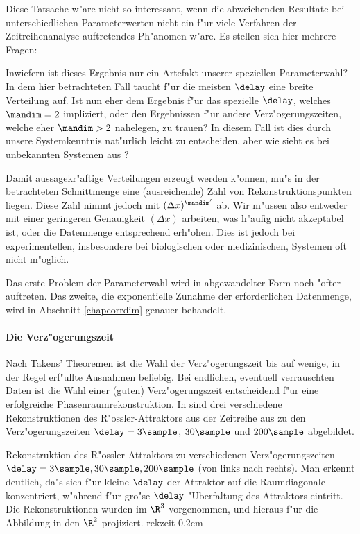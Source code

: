 Diese Tatsache w"are nicht so interessant, wenn die abweichenden Resultate bei
unterschiedlichen Parameterwerten nicht ein f"ur viele Verfahren der Zeitreihenanalyse
auftretendes Ph"anomen w"are. Es stellen sich hier mehrere Fragen:
\begin{myitemize}
\item Inwiefern ist dieses Ergebnis nur ein Artefakt unserer speziellen Parameterwahl? In
  dem hier betrachteten Fall taucht f"ur die meisten $\delay$ eine breite Verteilung auf.
  Ist nun eher dem Ergebnis f"ur das spezielle $\delay$, welches $\mandim=2$ impliziert,
  oder den Ergebnissen f"ur andere Verz"ogerungszeiten, welche eher $\mandim>2$ nahelegen,
  zu trauen? In diesem Fall ist dies durch unsere Systemkenntnis nat"urlich leicht zu
  entscheiden, aber wie sieht es bei unbekannten Systemen aus ?
\item Damit aussagekr"aftige Verteilungen erzeugt werden k"onnen, mu"s in der
  betrachteten Schnittmenge eine \naja(ausreichende) Zahl von Rekonstruktionspunkten
  liegen. Diese Zahl nimmt jedoch mit $(\Delta x)^{\mandim'}$ ab. Wir m"ussen also
  entweder mit einer geringeren Genauigkeit $(\Delta x)$ arbeiten, was h"aufig nicht
  akzeptabel ist, oder die Datenmenge entsprechend erh"ohen. Dies ist jedoch bei
  experimentellen, insbesondere bei biologischen oder medizinischen, Systemen oft
  nicht m"oglich.
\end{myitemize}

Das erste Problem der Parameterwahl wird in abgewandelter Form noch "ofter auftreten. Das
zweite, die exponentielle Zunahme der erforderlichen Datenmenge, wird in Abschnitt
\ref{chapcorrdim} genauer behandelt.

\paragraph{Die Verz"ogerungszeit}
\label{chapdelay}

Nach Takens' Theoremen ist die Wahl der Verz"ogerungszeit bis auf wenige, in der Regel
erf"ullte Ausnahmen beliebig. Bei endlichen, eventuell verrauschten Daten ist die Wahl
einer \naja(guten) Verz"ogerungszeit entscheidend f"ur eine erfolgreiche
Phasenraumrekonstruktion. In  sind drei verschiedene Rekonstruktionen des
R"ossler-Attraktors aus der Zeitreihe aus  zu den Verz"ogerungszeiten
$\delay=3\sample$, $30\sample$ und $200\sample$ abgebildet.

 {Rekonstruktion des
  R"ossler-Attraktors zu verschiedenen Verz"ogerungszeiten $\delay=3\sample, 30\sample,
  200\sample$ (von links nach rechts). Man erkennt deutlich, da"s sich f"ur kleine
  $\delay$ der Attraktor auf die Raumdiagonale konzentriert, w"ahrend f"ur gro"se $\delay$
  "Uberfaltung des Attraktors eintritt. Die Rekonstruktionen wurden im $\R^3$ vorgenommen,
  und hieraus f"ur die Abbildung in den $\R^2$ projiziert.  
}{rekzeit}{-0.2cm}

